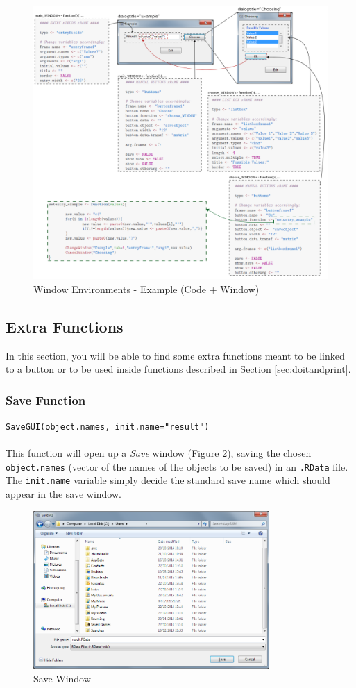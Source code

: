 \documentclass[a4paper]{article}\usepackage[]{graphicx}\usepackage[]{color}
\begin{document}
\begin{figure}[H]
\centering
\includegraphics[width=\linewidth]{figures/windowenvir_example.png}
\caption{Window Environments - Example (Code + Window)\label{windowenvir_example}}
\end{figure}


\newpage

\subsection{Extra Functions}
\noindent In this section, you will be able to find some extra functions meant
to be linked to a button or to be used inside functions described in Section
\ref{sec:doitandprint}.
\subsubsection{Save Function}
\texttt{SaveGUI(object.names, init.name="result")}\\ \\
This function will open up a {\it Save} window (Figure \ref{saveGUI}), saving
the chosen \verb|object.names| (vector of the names of the objects to be saved)
in an \verb|.RData| file. The \verb|init.name| variable simply decide the
standard save name which should appear in the save window.
\begin{figure}[H]
\centering
\includegraphics[width=9cm]{figures/saveGUI.png}
\caption{Save Window \label{saveGUI}}
\end{figure}
\end{document}
